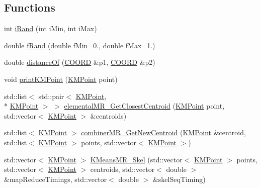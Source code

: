 \subsection*{Functions}
\begin{DoxyCompactItemize}
\item 
int \hyperlink{namespaceKMeans__MapReduce_afdd814de48bd8f8ee4d3b5046452e120}{i\-Rand} (int i\-Min, int i\-Max)
\item 
double \hyperlink{namespaceKMeans__MapReduce_add51d8d3039809f3398107c0875c8c1b}{f\-Rand} (double f\-Min=0., double f\-Max=1.)
\item 
double \hyperlink{namespaceKMeans__MapReduce_a641fcf6cec59b7626e10e89a580b3d3d}{distance\-Of} (\hyperlink{namespaceKMeans__MapReduce_a8dfbbc4a186c8ea8ae691f4a85db53e3}{C\-O\-O\-R\-D} \&p1, \hyperlink{namespaceKMeans__MapReduce_a8dfbbc4a186c8ea8ae691f4a85db53e3}{C\-O\-O\-R\-D} \&p2)
\item 
void \hyperlink{namespaceKMeans__MapReduce_a7cb6ca49c0fa1c2277452c37bccf53e1}{print\-K\-M\-Point} (\hyperlink{classKMeans__MapReduce_1_1KMPoint}{K\-M\-Point} point)
\item 
std\-::list$<$ std\-::pair$<$ \hyperlink{classKMeans__MapReduce_1_1KMPoint}{K\-M\-Point}, \\*
\hyperlink{classKMeans__MapReduce_1_1KMPoint}{K\-M\-Point} $>$ $>$ \hyperlink{namespaceKMeans__MapReduce_a2c7d89ec14b9139bef11124ced4b6379}{elemental\-M\-R\-\_\-\-Get\-Closest\-Centroid} (\hyperlink{classKMeans__MapReduce_1_1KMPoint}{K\-M\-Point} point, std\-::vector$<$ \hyperlink{classKMeans__MapReduce_1_1KMPoint}{K\-M\-Point} $>$ \&centroids)
\item 
std\-::list$<$ \hyperlink{classKMeans__MapReduce_1_1KMPoint}{K\-M\-Point} $>$ \hyperlink{namespaceKMeans__MapReduce_a0c17f1e970fe25155d1019441692f230}{combiner\-M\-R\-\_\-\-Get\-New\-Centroid} (\hyperlink{classKMeans__MapReduce_1_1KMPoint}{K\-M\-Point} \&centroid, std\-::list$<$ \hyperlink{classKMeans__MapReduce_1_1KMPoint}{K\-M\-Point} $>$ points, std\-::vector$<$ \hyperlink{classKMeans__MapReduce_1_1KMPoint}{K\-M\-Point} $>$)
\item 
std\-::vector$<$ \hyperlink{classKMeans__MapReduce_1_1KMPoint}{K\-M\-Point} $>$ \hyperlink{namespaceKMeans__MapReduce_a2ecd357b5ea731ac0ca5b12f64ab9326}{K\-Means\-M\-R\-\_\-\-Skel} (std\-::vector$<$ \hyperlink{classKMeans__MapReduce_1_1KMPoint}{K\-M\-Point} $>$ points, std\-::vector$<$ \hyperlink{classKMeans__MapReduce_1_1KMPoint}{K\-M\-Point} $>$ centroids, std\-::vector$<$ double $>$ \&map\-Reduce\-Timings, std\-::vector$<$ double $>$ \&skel\-Seq\-Timing)

\end{DoxyCompactItemize}
